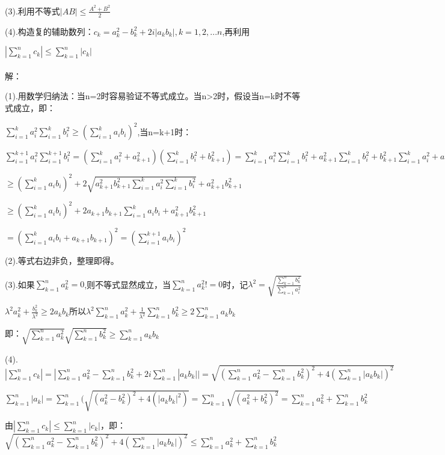 \documentclass[12pt]{ctexart}
\begin{document}
(3).利用不等式$|AB|\le\frac{A^2+B^2}{2}$

(4).构造复的辅助数列：$c_k=a_k^2-b_k^2+2i|a_kb_k|,k=1,2,...n$,再利用

$|\sum\limits_{k=1}^nc_k|\le\sum\limits_{k=1}^n|c_k|$\\\\
解：

(1).用数学归纳法：当n=2时容易验证不等式成立。当n>2时，假设当n=k时不等式成立，即：

$\sum\limits_{i=1}^ka_i^2\sum\limits_{i=1}^kb_i^2\ge(\sum\limits_{i=1}^{k}a_ib_i)^2$,当n=k+1时：

$\sum\limits_{i=1}^{k+1}a_i^2\sum\limits_{i=1}^{k+1}b_i^2=(\sum\limits_{i=1}^ka_i^2+a_{k+1}^2)(\sum\limits_{i=1}^{k}b_i^2+b_{k+1}^2)=\sum\limits_{i=1}^ka_i^2\sum\limits_{i=1}^kb_i^2+a_{k+1}^2\sum\limits_{i=1}^kb_i^2+b_{k+1}^2\sum\limits_{i=1}^ka_i^2+a_{k+1}^2b_{k+1}^2$

$\ge(\sum\limits_{i=1}^{k}a_ib_i)^2+2\sqrt{a_{k+1}^2b_{k+1}^2\sum\limits_{i=1}^ka_i^2\sum\limits_{i=1}^kb_i^2}+a_{k+1}^2b_{k+1}^2$

$\ge(\sum\limits_{i=1}^{k}a_ib_i)^2+2a_{k+1}b_{k+1}\sum\limits_{i=1}^ka_ib_i+a_{k+1}^2b_{k+1}^2$

$=(\sum\limits_{i=1}^{k}a_ib_i+a_{k+1}b_{k+1})^2=(\sum\limits_{i=1}^{k+1}a_ib_i)^2$

(2).等式右边非负，整理即得。

(3).如果$\sum\limits_{k=1}^na_k^2=0$,则不等式显然成立，当$\sum\limits_{k=1}^na_k^2!=0$时，记$\lambda^2=\sqrt{\frac{\sum\limits_{k=1}^{n}b_k^2}{\sum\limits_{k=1}^{n}a_i^2}}$

$\lambda^2a_k^2+\frac{b_k^2}{\lambda^2}\ge2a_kb_k$所以$\lambda^2\sum\limits_{k=1}^na_k^2+\frac{1}{\lambda^2}\sum\limits_{k=1}^nb_k^2\ge2\sum\limits_{k=1}^na_kb_k$

即：$\sqrt{\sum\limits_{k=1}^na_k^2}\sqrt{\sum\limits_{k=1}^nb_k^2}\ge\sum\limits_{k=1}^na_kb_k$

(4).$|\sum\limits_{k=1}^nc_k|=|\sum\limits_{k=1}^na_k^2-\sum\limits_{k=1}^nb_k^2+2i\sum\limits_{k=1}^n|a_kb_k||=\sqrt{(\sum\limits_{k=1}^na_k^2-\sum\limits_{k=1}^nb_k^2)^2+4(\sum\limits_{k=1}^n|a_kb_k|)^2}$

$\sum\limits_{k=1}^n|a_k|=\sum\limits_{k=1}^n(\sqrt{(a_k^2-b_k^2)^2+4(|a_kb_k|^2)}=\sum\limits_{k=1}^{n}\sqrt{(a_k^2+b_k^2)^2}=\sum\limits_{k=1}^{n}a_k^2+\sum\limits_{k=1}^{n}b_k^2$

由$|\sum\limits_{k=1}^{n}c_k|\le\sum\limits_{k=1}^n|c_k|$，即：$\sqrt{(\sum\limits_{k=1}^na_k^2-\sum\limits_{k=1}^nb_k^2)^2+4(\sum\limits_{k=1}^n|a_kb_k|)^2}\le\sum\limits_{k=1}^{n}a_k^2+\sum\limits_{k=1}^{n}b_k^2$
\end{document}
